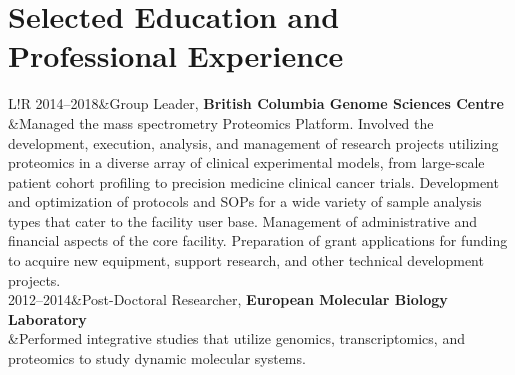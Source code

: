 \documentclass[11pt]{article}
\newcommand\VRule{\color{lightgray}\vrule width 0.5pt}
\begin{document}
{\section*{Selected Education and Professional Experience}
{\setlength{\extrarowheight}{4pt}%
\begin{tabular}{L!{\VRule}R}
	2014--2018&{Group Leader, }{\bf British Columbia Genome Sciences Centre}\\
	&Managed the mass spectrometry Proteomics Platform. Involved the development, execution, analysis, and management of research projects utilizing proteomics in a diverse array of clinical experimental models, from large-scale patient cohort profiling to precision medicine clinical cancer trials. Development and optimization of protocols and SOPs for a wide variety of sample analysis types that cater to the facility user base. Management of administrative and financial aspects of the core facility. Preparation of grant applications for funding to acquire new equipment, support research, and other technical development projects.\\
	2012--2014&{Post-Doctoral Researcher, }{\bf European Molecular Biology Laboratory}\\
	&Performed integrative studies that utilize genomics, transcriptomics, and proteomics to study dynamic molecular systems.\\
\end{tabular}

}}
\end{document}
